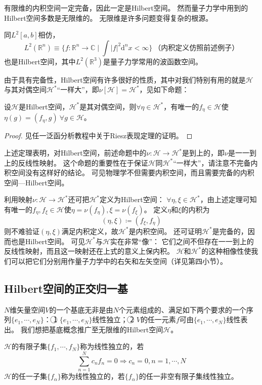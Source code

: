 \begin{note}
    有限维的内积空间一定完备，因此一定是Hilbert空间。
    然而量子力学中用到的Hilbert空间多数是无限维的。
    无限维是许多问题变得复杂的根源。
\end{note}

同$L^2[a, b]$相仿，
$$L^2(\mathbb{R}^n) \equiv \{f \colon \mathbb{R}^n \to \mathbb{C} \mid \int|f|^2\mathrm{d}^nx < \infty\} ~ \text{（内积定义仿照前述例子）}$$
也是Hilbert空间，其中$L^2(\mathbb{R}^3)$是量子力学常用的波函数空间。

由于具有完备性，Hilbert空间有许多很好的性质，其中对我们特别有用的就是$\mathscr{H}$与其对偶空间$\mathscr{H}^*$``一样大''，即$\nu[\mathscr{H}] = \mathscr{H}^*$，见如下命题：

\begin{theorem}
    设$\mathscr{H}$是Hilbert空间，$\mathscr{H}^*$是其对偶空间，则$\forall \eta \in \mathscr{H}^*$，有唯一的$f_\eta \in \mathscr{H}$使$\eta(g) = (f_\eta, g) ~ \forall g \in \mathscr{H}$。
\end{theorem}

\begin{proof}
    见任一泛函分析教程中关于Riesz表现定理的证明。
\end{proof}

\begin{note}
    上述定理表明，对Hilbert空间，前述命题中的$\nu \colon \mathscr{H} \to \mathscr{H}^*$是到上的，即$\nu$是一一到上的反线性映射。
    这个命题的重要性在于保证$\mathscr{H}$同$\mathscr{H}^*$``一样大''，请注意不完备内积空间没有这样好的结论。
    可见物理学不但需要内积空间，而且需要完备的内积空间---Hilbert空间。
\end{note}

利用映射$\nu \colon \mathscr{H} \to \mathscr{H}^*$还可把$\mathscr{H}^*$定义为Hilbert空间：
$\forall \eta, \xi \in \mathscr{H}^*$，由上述定理可知有唯一的$f_\eta, f_\xi \in \mathscr{H}$使$\eta = \nu(f_\eta), \xi = \nu(f_\xi)$。
定义$\eta$和$\xi$的内积为
$$(\eta, \xi) \coloneq (f_\xi, f_\eta)$$
则不难验证$(\eta, \xi)$满足内积定义，故$\mathscr{H}^*$是内积空间。
还可证明$\mathscr{H}^*$是完备的，因而也是Hilbert空间。
可见$\mathscr{H}^*$与$\mathscr{H}$实在非常``像''：
它们之间不但存在一一到上的反线性映射，而且这一映射还在上式的意义上保内积。
$\mathscr{H}$和$\mathscr{H}^*$的这种相像性使我们可以把它们分别用作量子力学中的右矢和左矢空间（详见第四小节）。

\subsection{Hilbert空间的正交归一基}

$N$维矢量空间$V$的一个基底无非是由$N$个元素组成的、满足如下两个要求的一个序列$\{e_1, \cdots, e_N\}$：
\textcircled{1} $\{e_1, \cdots, e_N\}$线性独立；
\textcircled{2} $V$的任一元素$f$可由$\{e_1, \cdots, e_N\}$线性表出。
我们想把基底概念推广至无限维的Hilbert空间$\mathscr{H}$。

\begin{definition}
    $\mathscr{H}$的有限子集$\{f_1, \cdots, f_N\}$称为线性独立的，若
    $$\sum^N_{n = 1}c_nf_n = 0 \Rightarrow c_n = 0, n = 1, \cdots, N$$
    $\mathscr{H}$的任一子集$\{f_\alpha\}$称为线性独立的，若$\{f_\alpha\}$的任一非空有限子集线性独立。
\end{definition}
